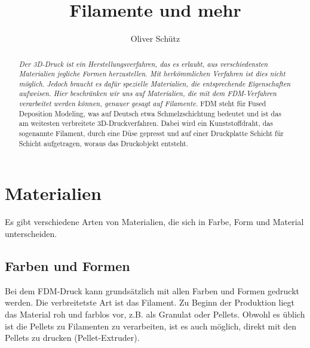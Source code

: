 \documentclass[10pt]{article}
\title{Filamente und mehr}
\author{Oliver Schütz}
\begin{document}
    \maketitle

    \begin{abstract}
        \textit
        {Der 3D-Druck ist ein Herstellungsverfahren, das es erlaubt, aus verschiedensten Materialien jegliche Formen herzustellen.
        Mit herkömmlichen Verfahren ist dies nicht möglich.
        Jedoch braucht es dafür spezielle Materialien, die entsprechende Eigenschaften aufweisen.
        Hier beschränken wir uns auf Materialien, die mit dem FDM-Verfahren verarbeitet werden können, genauer gesagt auf Filamente.}
        FDM steht für Fused Deposition Modeling, was auf Deutsch etwa Schmelzschichtung bedeutet und ist das am weitesten verbreitete 3D-Druckverfahren.
        Dabei wird ein Kunststoffdraht, das sogenannte Filament, durch eine Düse gepresst und auf einer Druckplatte Schicht für Schicht aufgetragen, woraus das Druckobjekt entsteht.
    \end{abstract}


    \section{Materialien}
    Es gibt verschiedene Arten von Materialien, die sich in Farbe, Form und Material unterscheiden.

    \subsection{Farben und Formen}
    Bei dem FDM-Druck kann grundsätzlich mit allen Farben und Formen gedruckt werden.
    Die verbreitetste Art ist das Filament.
    Zu Beginn der Produktion liegt das Material roh und farblos vor, z.B. als Granulat oder Pellets.
    Obwohl es üblich ist die Pellets zu Filamenten zu verarbeiten, ist es auch möglich, direkt mit den Pellets zu drucken (Pellet-Extruder).
\end{document}
